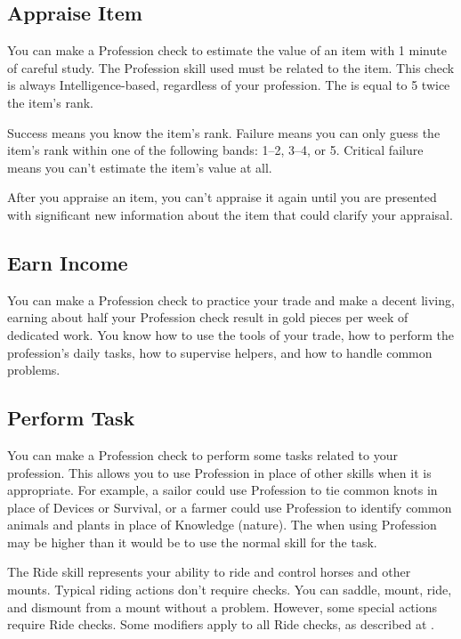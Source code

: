     \subsection{Appraise Item}
        You can make a Profession check to estimate the value of an item with 1 minute of careful study.
        The Profession skill used must be related to the item.
        This check is always Intelligence-based, regardless of your profession.
        The  is equal to 5 \add twice the item's rank.

        Success means you know the item's rank.
        Failure means you can only guess the item's rank within one of the following bands: 1--2, 3--4, or 5\plus.
        Critical failure means you can't estimate the item's value at all.

        After you appraise an item, you can't appraise it again until you are presented with significant new information about the item that could clarify your appraisal.

    \subsection{Earn Income}
        You can make a Profession check to practice your trade and make a decent living, earning about half your Profession check result in gold pieces per week of dedicated work. You know how to use the tools of your trade, how to perform the profession's daily tasks, how to supervise helpers, and how to handle common problems.

    \subsection{Perform Task}
        You can make a Profession check to perform some tasks related to your profession. This allows you to use Profession in place of other skills when it is appropriate. For example, a sailor could use Profession to tie common knots in place of Devices or Survival, or a farmer could use Profession to identify common animals and plants in place of Knowledge (nature). The  when using Profession may be higher than it would be to use the normal skill for the task.

\newpage
{}
    The Ride skill represents your ability to ride and control horses and other mounts.
    Typical riding actions don't require checks. You can saddle, mount, ride, and dismount from a mount without a problem. However, some special actions require Ride checks. Some modifiers apply to all Ride checks, as described at .

